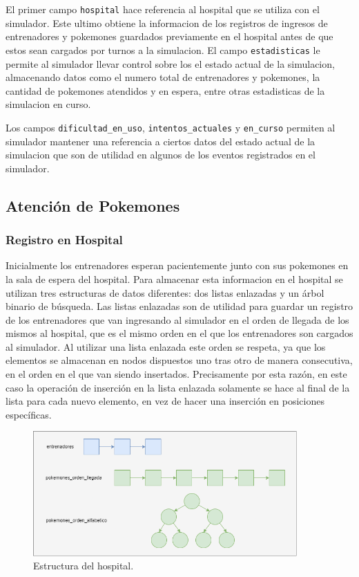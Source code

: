 \documentclass[titlepage,a4paper]{article}
\begin{document}
El primer campo \lstinline{hospital} hace referencia al hospital que se utiliza
con el simulador. Este ultimo obtiene la informacion de los registros de
ingresos de entrenadores y pokemones guardados previamente en el hospital antes
de que estos sean cargados por turnos a la simulacion. El campo
\lstinline{estadisticas} le permite al simulador llevar control sobre los
el estado actual de la simulacion, almacenando datos como el numero total de
entrenadores y pokemones, la cantidad de pokemones atendidos y en espera, entre
otras estadisticas de la simulacion en curso.

Los campos \lstinline{dificultad_en_uso}, \lstinline{intentos_actuales} y
\lstinline{en_curso} permiten al simulador mantener una referencia a ciertos
datos del estado actual de la simulacion que son de utilidad en algunos de los
eventos registrados en el simulador.

\subsection{Atención de Pokemones}

\subsubsection{Registro en Hospital}

Inicialmente los entrenadores esperan pacientemente junto con sus pokemones en
la sala de espera del hospital. Para almacenar esta informacion en el hospital
se utilizan tres estructuras de datos diferentes: dos listas enlazadas y un
árbol binario de búsqueda. Las listas enlazadas son de utilidad para guardar un
registro de los entrenadores que van ingresando al simulador en el orden de
llegada de los mismos al hospital, que es el mismo orden en el que los
entrenadores son cargados al simulador. Al utilizar una lista enlazada este
orden se respeta, ya que los elementos se almacenan en nodos dispuestos uno
tras otro de manera consecutiva, en el orden en el que van siendo insertados.
Precisamente por esta razón, en este caso la operación de inserción en la lista
enlazada solamente se hace al final de la lista para cada nuevo elemento, en vez
de hacer una inserción en posiciones específicas.

\begin{figure}[H]
\centering
\includegraphics[width=0.9\textwidth]{img/1_hospital.png}
\caption{\label{fig:seq01}Estructura del hospital.}
\end{figure}
\end{document}

